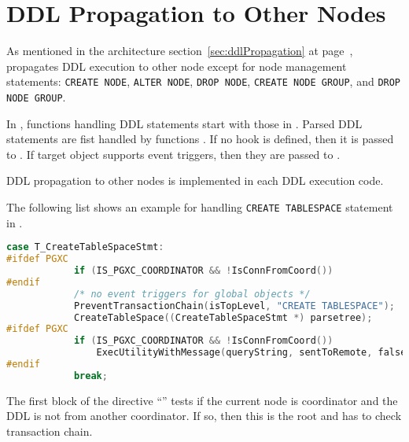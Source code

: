 %
%


\section{DDL Propagation to Other Nodes}
  
  As mentioned in the architecture section~\ref{sec:ddlPropagation} at page~\pageref{sec:ddlPropagation},
  \XC{} propagates DDL execution to other
  node except for node management statements:
  \texttt{CREATE NODE}, \texttt{ALTER NODE}, \texttt{DROP NODE}, 
  \texttt{CREATE NODE GROUP}, and \texttt{DROP NODE GROUP}.
  
  In \PG, functions handling DDL statements start with those in
  .
  Parsed DDL statements are fist handled by functions .
  If no hook is defined, then it is passed to .
  If target object supports event triggers, then they are passed to
  .
  
  DDL propagation to other nodes is implemented in each DDL execution code.
  
  The following list shows an example for handling \texttt{CREATE TABLESPACE} statement
  in .

  \lstset{tabsize=4, xleftmargin=20pt, basicstyle=\ttfamily\scriptsize, breaklines=true}
  \begin{lstlisting}[frame=single, tabsize=4, language=C]
        case T_CreateTableSpaceStmt:
#ifdef PGXC
            if (IS_PGXC_COORDINATOR && !IsConnFromCoord())
#endif
            /* no event triggers for global objects */
            PreventTransactionChain(isTopLevel, "CREATE TABLESPACE");
            CreateTableSpace((CreateTableSpaceStmt *) parsetree);
#ifdef PGXC
            if (IS_PGXC_COORDINATOR && !IsConnFromCoord())
                ExecUtilityWithMessage(queryString, sentToRemote, false);
#endif
            break;
  \end{lstlisting}

  The first block of the directive ``'' tests if the current node is coordinator and
  the DDL is not from another coordinator.
  If so, then this is the root and has to check transaction chain.
  
